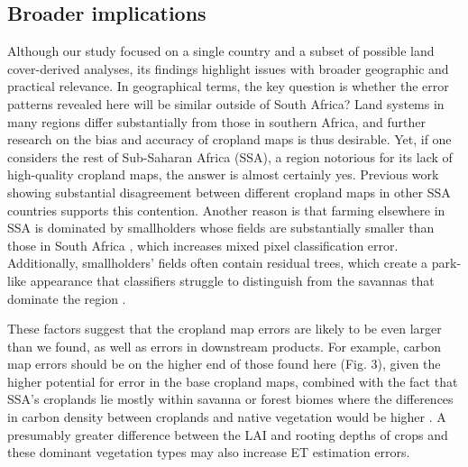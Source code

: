 \documentclass[a4paper]{article}
\begin{document}
\subsection*{Broader implications}
\vspace{-0.2 cm}
Although our study focused on a single country and a subset of possible land cover-derived analyses, its findings highlight issues with broader geographic and practical relevance. In geographical terms, the key question is whether the error patterns revealed here will be similar outside of South Africa? Land systems in many regions differ substantially from those in southern Africa, and further research on the bias and accuracy of cropland maps is thus desirable. Yet, if one considers the rest of Sub-Saharan Africa (SSA), a region notorious for its lack of high-quality cropland maps, the answer is almost certainly yes. Previous work showing substantial disagreement between different cropland maps in other SSA countries \citep{fritz_comparison_2010} supports this contention. Another reason is that farming elsewhere in SSA is dominated by smallholders whose fields are substantially smaller than those in South Africa \citep{samberg_subnational_2016}, which increases mixed pixel classification error. Additionally, smallholders' fields often contain residual trees, which create a park-like appearance that classifiers struggle to distinguish from the savannas that dominate the region \citep{estes_reconciling_2016,debats_generalized_2016,sweeney_mapping_2015}.   

These factors suggest that the cropland map errors are likely to be even larger than we found, as well as errors in downstream products. For example, carbon map errors should be on the higher end of those found here (Fig. 3), given the higher potential for error in the base cropland maps, combined with the fact that SSA's croplands lie mostly within savanna or forest biomes where the differences in carbon density between croplands and native vegetation would be higher \citep{searchinger_high_2015}. A presumably greater difference between the LAI and rooting depths of crops and these dominant vegetation types may also increase ET estimation errors.  
\end{document}
